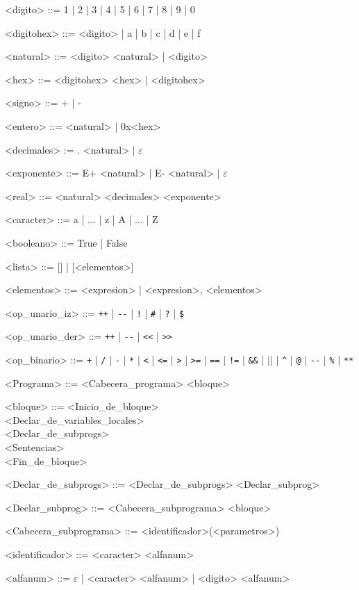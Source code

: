 \documentclass{scrartcl}
\begin{document}
\setlength{\grammarparsep}{4pt plus 1pt minus 1pt}
\begin{grammar}

<digito> ::= 1 | 2 | 3 | 4 | 5 | 6 | 7 | 8 | 9 | 0

<digitohex> ::= <digito> | a | b | c | d | e | f

<natural> ::= <digito> <natural> | <digito>

<hex> ::= <digitohex> <hex> | <digitohex>

<signo> ::= + | -

<entero> ::= <natural> | 0x<hex>

<decimales> := . <natural> | $\varepsilon$

<exponente> ::= E+ <natural> | E- <natural> | $\varepsilon$

<real> ::= <natural> <decimales> <exponente>

<caracter> ::= a | ... | z | A | ... | Z

<booleano> ::= True | False

<lista> ::= [] | [<elementos>]

<elementos> ::= <expresion> | <expresion>, <elementos>

<op_unario_iz> ::= \verb|++| | \verb|--| | \verb|!| | \verb|#| | \verb|?| | \verb|$|

<op_unario_der> ::= \verb|++| | \verb|--| | \verb|<<| | \verb|>>|

<op_binario> ::= \verb|+| | \verb|/| | \verb|-| | \verb|*| | \verb|<| | \verb|<=| | \verb|>| | \verb|>=| | \verb|==| | \verb|!=| | \verb|&&| | \verb|||| | \verb|^| | \verb|@| | \verb|--| | \verb|%| | \verb|**|

<Programa> ::= <Cabecera_programa> <bloque>

<bloque> ::= <Inicio_de_bloque> \\
 <Declar_de_variables_locales> \\
 <Declar_de_subprogs> \\
 <Sentencias> \\
 <Fin_de_bloque>

<Declar_de_subprogs> ::= <Declar_de_subprogs> <Declar_subprog>

<Declar_subprog> ::= <Cabecera_subprograma> <bloque>

<Cabecera_subprograma> ::= <identificador>(<parametros>)

<identificador> ::= <caracter> <alfanum>

<alfanum> ::= $\varepsilon$ | <caracter> <alfanum> | <digito> <alfanum>


\end{grammar}
\end{document}
